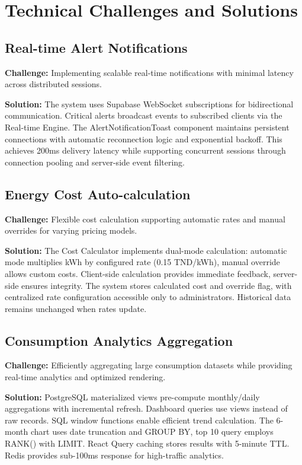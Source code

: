 \section{Technical Challenges and Solutions}

\subsection{Real-time Alert Notifications}

\textbf{Challenge:} Implementing scalable real-time notifications with minimal latency across distributed sessions.

\textbf{Solution:} The system uses Supabase WebSocket subscriptions for bidirectional communication. Critical alerts broadcast events to subscribed clients via the Real-time Engine. The AlertNotificationToast component maintains persistent connections with automatic reconnection logic and exponential backoff. This achieves 200ms delivery latency while supporting concurrent sessions through connection pooling and server-side event filtering.

\subsection{Energy Cost Auto-calculation}

\textbf{Challenge:} Flexible cost calculation supporting automatic rates and manual overrides for varying pricing models.

\textbf{Solution:} The Cost Calculator implements dual-mode calculation: automatic mode multiplies kWh by configured rate (0.15 TND/kWh), manual override allows custom costs. Client-side calculation provides immediate feedback, server-side ensures integrity. The system stores calculated cost and override flag, with centralized rate configuration accessible only to administrators. Historical data remains unchanged when rates update.

\subsection{Consumption Analytics Aggregation}

\textbf{Challenge:} Efficiently aggregating large consumption datasets while providing real-time analytics and optimized rendering.

\textbf{Solution:} PostgreSQL materialized views pre-compute monthly/daily aggregations with incremental refresh. Dashboard queries use views instead of raw records. SQL window functions enable efficient trend calculation. The 6-month chart uses date truncation and GROUP BY, top 10 query employs RANK() with LIMIT. React Query caching stores results with 5-minute TTL. Redis provides sub-100ms response for high-traffic analytics.


